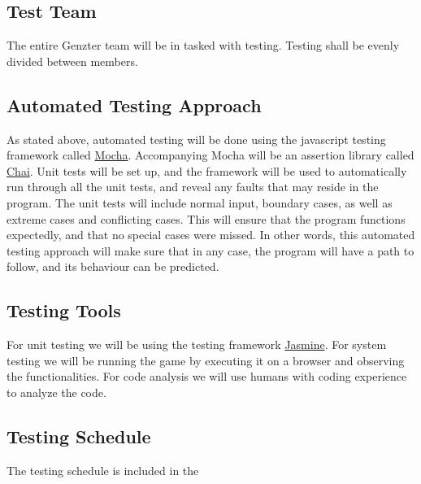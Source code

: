 \documentclass[11pt, oneside]{article}   	%
\begin{document}
\subsection{Test Team}
The entire Genzter team will be in tasked with testing. Testing shall be evenly divided between members.

\subsection{Automated Testing Approach}
As stated above, automated testing will be done using the javascript testing framework called \href{http://mochajs.org}{Mocha}. Accompanying Mocha will be an assertion library called \href{http://chaijs.com/}{Chai}. Unit tests will be set up, and the framework will be used to automatically run through all the unit tests, and reveal any faults that may reside in the program. The unit tests will include normal input, boundary cases, as well as extreme cases and conflicting cases. This will ensure that the program functions expectedly, and that no special cases were missed. In other words, this automated testing approach will make sure that in any case, the program will have a path to follow, and its behaviour can be predicted.

\subsection{Testing Tools}
For unit testing we will be using the testing framework \href{http://jasmine.github.io/}{Jasmine}. For system testing we will be running the game by executing it on a browser and observing the functionalities. For code analysis we will use humans with coding experience to analyze the code.

\subsection{Testing Schedule}
The testing schedule is included in the
 
\end{document}
